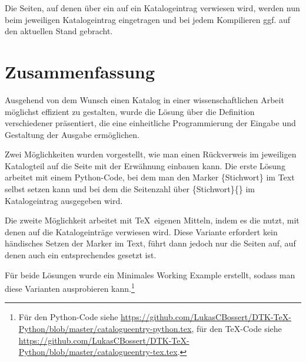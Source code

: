 \documentclass[ngerman]{dtk}
\begin{document}
Die Seiten, auf denen über ein   auf ein Katalogeintrag verwiesen wird,
werden nun beim jeweiligen Katalogeintrag eingetragen und bei jedem Kompilieren ggf. auf den aktuellen Stand gebracht.

\section{Zusammenfassung}
Ausgehend von dem Wunsch einen Katalog in einer wissenschaftlichen Arbeit möglichst effizient zu gestalten, 
wurde die Lösung über die Definition verschiedener   präsentiert,
die eine einheitliche Programmierung der Eingabe und Gestaltung der Ausgabe ermöglichen.

Zwei Möglichkeiten wurden vorgestellt,
wie man einen Rückverweis im jeweiligen Katalogteil auf die Seite mit der Erwähnung einbauen kann.
Die erste Lösung arbeitet mit einem Python-Code, 
bei dem man den Marker \{Stichwort\} im Text selbst setzen kann und bei dem die Seitenzahl über 
\{Stichwort\}\{\} im Katalogeintrag ausgegeben wird.

Die zweite Möglichkeit arbeitet mit \TeX\ eigenen Mitteln,
indem es die  nutzt, mit denen auf die Katalogeinträge verwiesen wird.
Diese Variante erfordert kein händisches Setzen der Marker im Text,
führt dann jedoch nur die Seiten auf, auf denen auch ein entsprechendes   gesetzt ist.

Für beide Lösungen wurde ein Minimales Working Example erstellt,
sodass man diese Varianten ausprobieren kann.\footnote{Für den Python-Code siehe
\url{https://github.com/LukasCBossert/DTK-TeX-Python/blob/master/catalogueentry-python.tex}, für den \TeX -Code siehe  
\url{https://github.com/LukasCBossert/DTK-TeX-Python/blob/master/catalogueentry-tex.tex}.}
\end{document}
